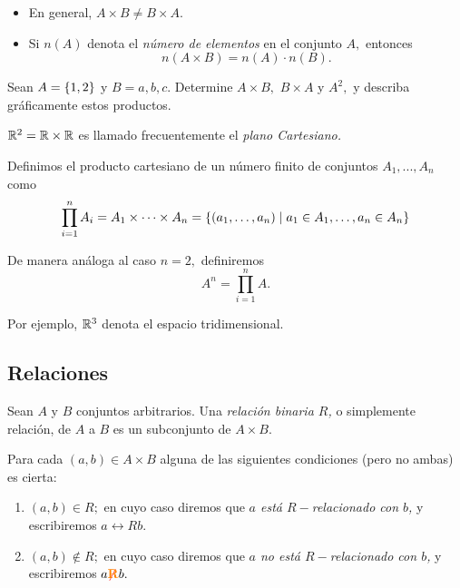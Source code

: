	\begin{rem}
		\begin{itemize}
			\item En general, $A\times B \neq B \times A.$
			\item Si \emph{$n(A)$} denota el \emph{n\'umero de elementos} en el conjunto $A,$ entonces
			$$
			n(A \times B)= n(A) \cdot n(B).
			$$
		\end{itemize}
		
	\end{rem}
	




	Sean $A=\left\{ 1,2 \right\}$ y $B={a,b,c}.$ Determine $A\times B,$ $B\times A$ y $A^{2},$ y describa gr\'aficamente estos productos.



	\begin{exmp}
		$\mathbb{R}^{2}=\mathbb{R} \times \mathbb{R}$ es llamado frecuentemente el \emph{plano Cartesiano.}
	\end{exmp}
	



	\begin{defn}
		Definimos el producto cartesiano de un n\'umero finito de conjuntos $A_{1},...,A_{n}$ como
		$$
		\prod_{i=1}^{n} A_{i}= A_{1} \times \cdots \times A_{n}=\left\{ \left( a_{1},\dots,a_{n} \right)\mid a_{1}\in A_{1}, \dots, a_{n}\in A_{n} \right\}
		$$
	\end{defn}
	



	\begin{rem}
		De manera an\'aloga al caso $n=2,$ definiremos
		$$
		A^{n}=\prod_{i=1}^{n}A.
		$$
		
		
		Por ejemplo, $\mathbb{R}^{3}$ denota el espacio tridimensional.
	\end{rem}
	


\subsection{Relaciones}


	\begin{defn}
		Sean $A$ y $B$ conjuntos arbitrarios. Una \emph{relaci\'on binaria $R$,} o simplemente relaci\'on, de $A$ a $B$ es un subconjunto de $A \times B.$
	\end{defn}
	



	Para cada $(a,b)\in A \times B$ alguna de las siguientes condiciones (pero no ambas) es cierta:
	\begin{enumerate}
		\item $(a,b)\in R;$ en cuyo caso diremos que \emph{$a$ est\'a $R-$relacionado con $b$,} y escribiremos $a \rel{R} b.$
		\item $(a,b)\not\in R;$ en cuyo caso diremos que \emph{$a$ no est\'a $R-$relacionado con $b$,} y escribiremos $a { {\color{red}\not}{\color{orange}\textbf{R}} } b.$
	\end{enumerate}
	



